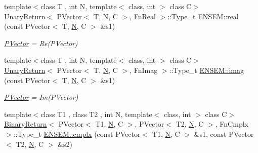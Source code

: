\begin{DoxyCompactItemize}
\item 
{\footnotesize template$<$class T , int N, template$<$ class, int $>$ class C$>$ }\\\mbox{\hyperlink{structUnaryReturn}{Unary\+Return}}$<$ P\+Vector$<$ T, \mbox{\hyperlink{adat__devel_2lib_2hadron_2operator__name__util_8cc_a7722c8ecbb62d99aee7ce68b1752f337}{N}}, C $>$, Fn\+Real $>$\+::Type\+\_\+t \mbox{\hyperlink{group__primvector_ga9198795b4cc43e6d68f0273dd10b3aa1}{E\+N\+S\+E\+M\+::real}} (const P\+Vector$<$ T, \mbox{\hyperlink{adat__devel_2lib_2hadron_2operator__name__util_8cc_a7722c8ecbb62d99aee7ce68b1752f337}{N}}, C $>$ \&s1)
\begin{DoxyCompactList}\small\item\em \mbox{\hyperlink{classENSEM_1_1PVector}{P\+Vector}} = Re(\+P\+Vector) \end{DoxyCompactList}\item 
{\footnotesize template$<$class T , int N, template$<$ class, int $>$ class C$>$ }\\\mbox{\hyperlink{structUnaryReturn}{Unary\+Return}}$<$ P\+Vector$<$ T, \mbox{\hyperlink{adat__devel_2lib_2hadron_2operator__name__util_8cc_a7722c8ecbb62d99aee7ce68b1752f337}{N}}, C $>$, Fn\+Imag $>$\+::Type\+\_\+t \mbox{\hyperlink{group__primvector_ga29974958f6885a4267cae10b6bec2344}{E\+N\+S\+E\+M\+::imag}} (const P\+Vector$<$ T, \mbox{\hyperlink{adat__devel_2lib_2hadron_2operator__name__util_8cc_a7722c8ecbb62d99aee7ce68b1752f337}{N}}, C $>$ \&s1)
\begin{DoxyCompactList}\small\item\em \mbox{\hyperlink{classENSEM_1_1PVector}{P\+Vector}} = Im(\+P\+Vector) \end{DoxyCompactList}\item 
{\footnotesize template$<$class T1 , class T2 , int N, template$<$ class, int $>$ class C$>$ }\\\mbox{\hyperlink{structBinaryReturn}{Binary\+Return}}$<$ P\+Vector$<$ T1, \mbox{\hyperlink{adat__devel_2lib_2hadron_2operator__name__util_8cc_a7722c8ecbb62d99aee7ce68b1752f337}{N}}, C $>$, P\+Vector$<$ T2, \mbox{\hyperlink{adat__devel_2lib_2hadron_2operator__name__util_8cc_a7722c8ecbb62d99aee7ce68b1752f337}{N}}, C $>$, Fn\+Cmplx $>$\+::Type\+\_\+t \mbox{\hyperlink{group__primvector_ga4b7fc81e0d4329f6c328adee1c9daf7e}{E\+N\+S\+E\+M\+::cmplx}} (const P\+Vector$<$ T1, \mbox{\hyperlink{adat__devel_2lib_2hadron_2operator__name__util_8cc_a7722c8ecbb62d99aee7ce68b1752f337}{N}}, C $>$ \&s1, const P\+Vector$<$ T2, \mbox{\hyperlink{adat__devel_2lib_2hadron_2operator__name__util_8cc_a7722c8ecbb62d99aee7ce68b1752f337}{N}}, C $>$ \&s2)

\end{DoxyCompactItemize}
